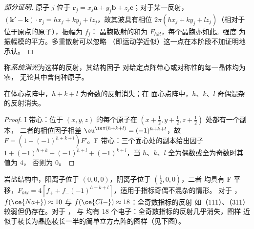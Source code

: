 \begin{proof}[部分证明]
原子 $j$ 位于 $\mathbf r_j = x_j\mathbf a + y_j\mathbf b + z_j\mathbf c$；对于某一反射，
$(\mathbf k' - \mathbf k)\cdot\mathbf r_j = hx_j + ky_j + lz_j$，故其波具有相位
$2\pi(hx_j + ky_j + lz_j)$（相对于位于原点的原子），振幅为 $f_j$：
晶胞散射的和为 $F_{hkl}$，每个晶胞亦如此。强度
为振幅模的平方。多重散射可以忽略
（即运动学近似）这一点在本阶段不加证明地承认。
\end{proof}

\begin{definition}[系统消光]\label{def:b3:x-ray-diffraction:absence}
称\emph{系统消光}为这样的反射，其结构因子
对给定点阵带心或对称性的每一晶体均为零，
无论其中含何种原子。
\end{definition}

\begin{proposition}[带心点阵的消光]\label{prop:b3:x-ray-diffraction:absences}
在体心点阵中，$h + k + l$ 为奇数的反射消失；在
面心点阵中，$h$、$k$、$l$ 奇偶混杂的反射消失。
\end{proposition}

\begin{proof}
I 带心：位于 $(x,y,z)$ 的每个原子在 $(x + \frac12, y + \frac12, z + \frac12)$ 处都有一个副本，
二者的相位因子相差 $\eu^{\iu\pi(h+k+l)} = (-1)^{h+k+l}$，故 $F = (1 +
(-1)^{h+k+l})F'$。F 带心：三个面心处的副本给出因子 $1 +
(-1)^{h+k} + (-1)^{h+l} + (-1)^{k+l}$，当 $h$、$k$、$l$ 全为偶数或全为奇数时其值为 4，
否则为 0。
\end{proof}

\begin{example}[岩盐与钾石盐]\label{ex:b3:x-ray-diffraction:nacl-kcl}
岩盐结构中，阳离子位于 $(0,0,0)$，阴离子位于 $(\frac12,0,0)$，二者
均具有 F 平移，$F_{hkl} = 4[f_+ + f_-(-1)^{h+k+l}]$，适用于指标奇偶不混杂的情形。
对于 ，$f(\ce{Na+}) \approx 10$ 与 $f(\ce{Cl-}) \approx 18$：全奇数指标的反射
如（111）、（311）较弱但仍存在。对于 ， 与  均有 18
个电子：全奇数指标的反射几乎消失，图样
近似于棱长为晶胞棱长一半的简单立方点阵的图样（见下图）。
\end{example}

